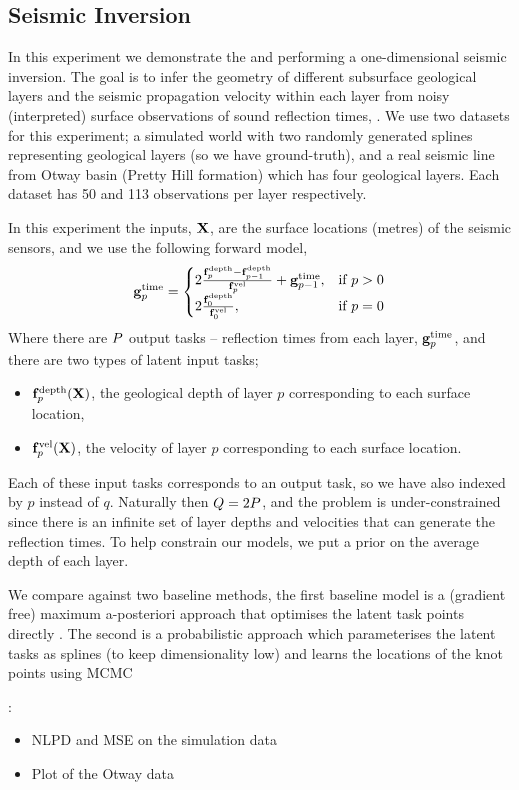 \subsection{Seismic Inversion}

In this experiment we demonstrate the \eks and \uks performing a
one-dimensional seismic inversion. The goal is to infer the geometry of
different subsurface geological layers and the seismic propagation velocity
within each layer from noisy (interpreted) surface observations of sound
reflection times, \Outs. We use two datasets for this experiment; a simulated
world with two randomly generated splines representing geological layers (so we
have ground-truth), and a real seismic line from Otway basin (Pretty Hill
formation) which has four geological layers. Each dataset has 50 and 113
observations per layer respectively.

In this experiment the inputs, $\mathbf{X}$, are the surface locations (metres) of
the seismic sensors, and we use the following forward model,
\begin{equation}
    \mathbf{g}_p^\text{time} =
    \begin{cases}
        2\frac{\mathbf{f}_p^\text{depth} - \mathbf{f}_{p-1}^\text{depth}}
        {\mathbf{f}_p^\text{vel}} + \mathbf{g}_{p-1}^\text{time},
        & \text{if } p > 0 \\
        2\frac{\mathbf{f}_0^\text{depth}}{\mathbf{f}_0^\text{vel}},
        & \text{if } p = 0
    \end{cases}
\end{equation}
Where there are $P$ output tasks -- reflection times from each layer,
$\mathbf{g}_p^\text{time}$, and there are two types of latent input tasks;
\begin{itemize}
    \item $\mathbf{f}_p^\text{depth}\!\left({\mathbf{X}}\right)$, the geological depth of layer
        $p$ corresponding to each surface location,
    \item $\mathbf{f}_p^\text{vel}\!\left({\mathbf{X}}\right)$, the velocity of layer $p$ 
        corresponding to each surface location.
\end{itemize}
Each of these input tasks corresponds to an output task, so we have also
indexed by $p$ instead of $q$. Naturally then $Q = 2P$, and the
problem is under-constrained since there is an infinite set of layer depths and
velocities that can generate the reflection times. To help constrain our
models, we put a prior on the average depth of each layer.

We compare against two baseline methods, the first baseline model is a
(gradient free) maximum a-posteriori approach that optimises the latent task
points directly . The second is a
probabilistic approach which parameterises the latent tasks as splines (to keep
dimensionality low) and learns the locations of the knot points using MCMC

:
\begin{itemize}
    \item NLPD and MSE on the simulation data
    \item Plot of the Otway data
\end{itemize}
